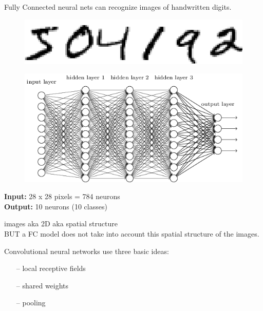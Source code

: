 \documentclass[10pt, compress]{beamer}
\begin{document}
\begin{frame}
  \vspace{0.6cm}
  \begin{multicols}{2}
    Fully Connected neural nets can recognize images of handwritten digits.
    \columnbreak
    \begin{figure}
      \includegraphics[width=.65\linewidth]{imgs/digits}
    \end{figure}
  \end{multicols}
  \begin{figure}
    \includegraphics[width=.75\linewidth]{imgs/mlp_4}
  \end{figure}
  \textbf{Input:} 28 x 28 pixels = 784 neurons \\
  \textbf{Output:} 10 neurons (10 classes)
\end{frame}

\begin{frame}
  images aka 2D aka spatial structure \\
  BUT a FC model does not take into account this spatial structure of the images.

  Convolutional neural networks use three basic ideas:\\
  \begin{itemize}
    \item[--] local receptive fields
    \item[--] shared weights
    \item[--] pooling
  \end{itemize}
\end{frame}
\end{document}
